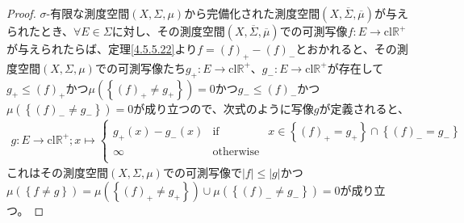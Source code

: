 \documentclass[dvipdfmx]{jsarticle}
\begin{document}
\begin{proof}
$\sigma$-有限な測度空間$(X,\varSigma,\mu)$から完備化された測度空間$\left( X,\overline{\varSigma},\overline{\mu} \right)$が与えられたとき、$\forall E \in \varSigma$に対し、その測度空間$\left( X,\overline{\varSigma},\overline{\mu} \right)$での可測写像$f:E \rightarrow \mathrm{cl}\mathbb{R}^{+}$が与えられたらば、定理\ref{4.5.5.22}より$f = (f)_{+} - (f)_{-}$とおかれると、その測度空間$(X,\varSigma,\mu)$での可測写像たち$g_{+}:E \rightarrow \mathrm{cl}\mathbb{R}^{+}$、$g_{-}:E \rightarrow \mathrm{cl}\mathbb{R}^{+}$が存在して$g_{+} \leq (f)_{+}$かつ$\mu\left( \left\{ (f)_{+} \neq g_{+} \right\} \right) = 0$かつ$g_{-} \leq (f)_{-}$かつ$\mu\left( \left\{ (f)_{-} \neq g_{-} \right\} \right) = 0$が成り立つので、次式のように写像$g$が定義されると、
\begin{align*}
g:E \rightarrow \mathrm{cl}\mathbb{R}^{+};x \mapsto \left\{ \begin{matrix}
g_{+}(x) - g_{-}(x) & \mathrm{if} & x \in \left\{ (f)_{+} = g_{+} \right\} \cap \left\{ (f)_{-} = g_{-} \right\} \\
\infty & \mathrm{otherwise} & \  \\
\end{matrix} \right.\ 
\end{align*}
これはその測度空間$(X,\varSigma,\mu)$での可測写像で$|f| \leq |g|$かつ$\mu\left( \left\{ f \neq g \right\} \right) = \mu\left( \left\{ (f)_{+} \neq g_{+} \right\} \right) \cup \mu\left( \left\{ (f)_{-} \neq g_{-} \right\} \right) = 0$が成り立つ。
\end{proof}
\end{document}
